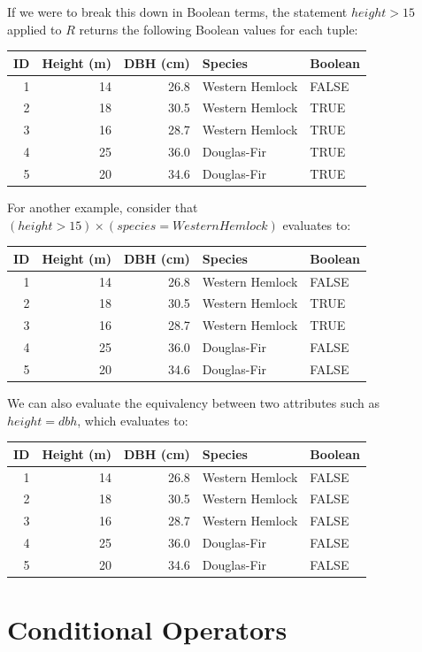 \documentclass[
]{book}
\begin{document}
If we were to break this down in Boolean terms, the statement \(height>15\) applied to \(R\) returns the following Boolean values for each tuple:

\begin{tabular}{rrrll}
\toprule
ID & Height (m) & DBH (cm) & Species & Boolean\\
\midrule
1 & 14 & 26.8 & Western Hemlock & FALSE\\
2 & 18 & 30.5 & Western Hemlock & TRUE\\
3 & 16 & 28.7 & Western Hemlock & TRUE\\
4 & 25 & 36.0 & Douglas-Fir & TRUE\\
5 & 20 & 34.6 & Douglas-Fir & TRUE\\
\bottomrule
\end{tabular}

For another example, consider that \((height>15)×(species=WesternHemlock)\) evaluates to:

\begin{tabular}{rrrll}
\toprule
ID & Height (m) & DBH (cm) & Species & Boolean\\
\midrule
1 & 14 & 26.8 & Western Hemlock & FALSE\\
2 & 18 & 30.5 & Western Hemlock & TRUE\\
3 & 16 & 28.7 & Western Hemlock & TRUE\\
4 & 25 & 36.0 & Douglas-Fir & FALSE\\
5 & 20 & 34.6 & Douglas-Fir & FALSE\\
\bottomrule
\end{tabular}

We can also evaluate the equivalency between two attributes such as \(height=dbh\), which evaluates to:

\begin{tabular}{rrrll}
\toprule
ID & Height (m) & DBH (cm) & Species & Boolean\\
\midrule
1 & 14 & 26.8 & Western Hemlock & FALSE\\
2 & 18 & 30.5 & Western Hemlock & FALSE\\
3 & 16 & 28.7 & Western Hemlock & FALSE\\
4 & 25 & 36.0 & Douglas-Fir & FALSE\\
5 & 20 & 34.6 & Douglas-Fir & FALSE\\
\bottomrule
\end{tabular}

\hypertarget{conditional-operators}{%
\section{Conditional Operators}\label{conditional-operators}}
\end{document}

